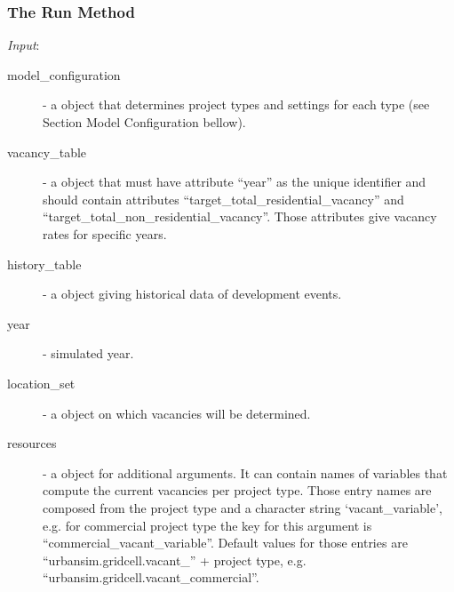 \subsubsection{The Run Method}
%
{\it Input}:
\begin{description}
\item[model_configuration] - a  object that determines
  project types and settings for each type (see
  Section Model \modelsindex Configuration bellow).
\item[vacancy_table] - a  \datasetindex object that must have attribute \attributesindex
  ``year'' as the unique identifier and should contain attributes \attributesindex
  ``target_total_residential_vacancy'' and
  ``target_total_non_residential_vacancy''. Those attributes \attributesindex give vacancy
  rates for specific years.
\item[history_table] - a  \datasetindex object giving historical data of
  development events.
\item[year] - simulated year.
\item[location_set] - a  \datasetindex object on which vacancies will be
  determined.
\item[resources] - a  object for additional arguments. It can
  contain names of variables \variablesindex that compute the current vacancies per project
  type. Those entry names are composed from the project type and a character
  string `vacant_variable', e.g. for commercial project type the key for this
  argument is ``commercial_vacant_variable''.  Default values for those
  entries are ``urbansim.gridcell.vacant_'' + project type, e.g.
  ``urbansim.gridcell.vacant_commercial''.
\end{description}



